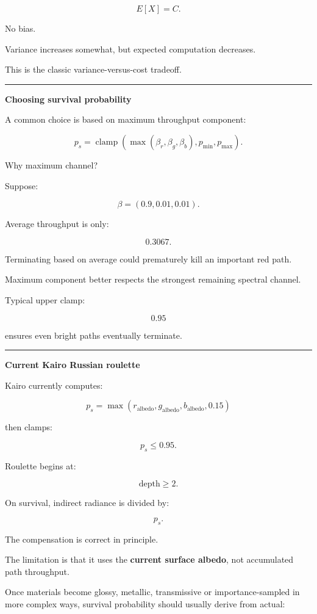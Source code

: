 \[
\boxed{
E[X]=C.
}
\]

No bias.

Variance increases somewhat, but expected computation decreases.

This is the classic variance-versus-cost tradeoff.

\begin{center}\rule{0.5\linewidth}{0.5pt}\end{center}

\textbf{Choosing survival probability}

A common choice is based on maximum throughput component:

\[
p_s
=
\operatorname{clamp}
(
\max(\beta_r,\beta_g,\beta_b),
p_{\min},
p_{\max}
).
\]

Why maximum channel?

Suppose:

\[
\beta=(0.9,0.01,0.01).
\]

Average throughput is only:

\[
0.3067.
\]

Terminating based on average could prematurely kill an important red path.

Maximum component better respects the strongest remaining spectral channel.

Typical upper clamp:

\[
0.95
\]

ensures even bright paths eventually terminate.

\begin{center}\rule{0.5\linewidth}{0.5pt}\end{center}

\textbf{Current Kairo Russian roulette}

Kairo currently computes:

\[
p_s
=
\max(
r_{\text{albedo}},
g_{\text{albedo}},
b_{\text{albedo}},
0.15
)
\]

then clamps:

\[
p_s\le0.95.
\]

Roulette begins at:

\[
\text{depth}\ge2.
\]

On survival, indirect radiance is divided by:

\[
p_s.
\]

The compensation is correct in principle.

The limitation is that it uses the \textbf{current surface albedo}, not accumulated path throughput.

Once materials become glossy, metallic, transmissive or importance-sampled in more complex ways, survival probability should usually derive from actual:

